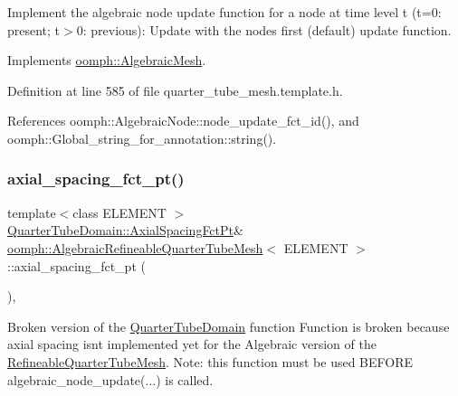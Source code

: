 Implement the algebraic node update function for a node at time level t (t=0\+: present; t$>$0\+: previous)\+: Update with the node\textquotesingle{}s first (default) update function. 



Implements \hyperlink{classoomph_1_1AlgebraicMesh_ab01d6f93354f3c4e5c9d1f0a5885a65b}{oomph\+::\+Algebraic\+Mesh}.



Definition at line 585 of file quarter\+\_\+tube\+\_\+mesh.\+template.\+h.



References oomph\+::\+Algebraic\+Node\+::node\+\_\+update\+\_\+fct\+\_\+id(), and oomph\+::\+Global\+\_\+string\+\_\+for\+\_\+annotation\+::string().

\mbox{\label{classoomph_1_1AlgebraicRefineableQuarterTubeMesh_ac6518f83dd81c5ef1a8d908be8c9f473}} 
\subsubsection{\texorpdfstring{axial\+\_\+spacing\+\_\+fct\+\_\+pt()}{axial\_spacing\_fct\_pt()}}
{\footnotesize\ttfamily template$<$class E\+L\+E\+M\+E\+NT $>$ \\
\hyperlink{classoomph_1_1QuarterTubeDomain_ae347af42a5dcb9b3b82c2247975b01db}{Quarter\+Tube\+Domain\+::\+Axial\+Spacing\+Fct\+Pt}\& \hyperlink{classoomph_1_1AlgebraicRefineableQuarterTubeMesh}{oomph\+::\+Algebraic\+Refineable\+Quarter\+Tube\+Mesh}$<$ E\+L\+E\+M\+E\+NT $>$\+::axial\+\_\+spacing\+\_\+fct\+\_\+pt (\begin{DoxyParamCaption}{ }\end{DoxyParamCaption})\hspace{0.3cm}{\ttfamily [inline]}, {\ttfamily [virtual]}}



Broken version of the \hyperlink{classoomph_1_1QuarterTubeDomain}{Quarter\+Tube\+Domain} function Function is broken because axial spacing isn\textquotesingle{}t implemented yet for the Algebraic version of the \hyperlink{classoomph_1_1RefineableQuarterTubeMesh}{Refineable\+Quarter\+Tube\+Mesh}. Note\+: this function must be used B\+E\+F\+O\+RE algebraic\+\_\+node\+\_\+update(...) is called. 



